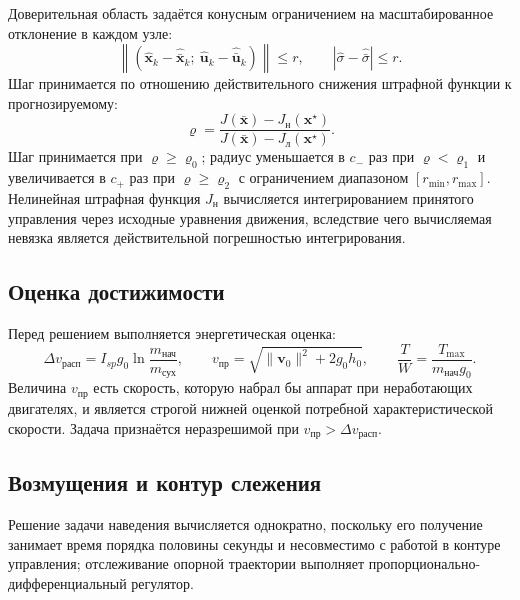 \documentclass[11pt,a4paper]{article}
\newcommand{\vect}[1]{\bm{#1}}
\begin{document}
Доверительная область задаётся конусным ограничением на масштабированное
отклонение в каждом узле:
\begin{equation}
\left\lVert\left(\hat{\vect{x}}_k-\hat{\bar{\vect{x}}}_k;\
 \hat{\vect{u}}_k-\hat{\bar{\vect{u}}}_k\right)\right\rVert \le r,
\qquad
\left\lvert \hat\sigma-\hat{\bar\sigma}\right\rvert \le r .
\end{equation}
Шаг принимается по отношению действительного снижения штрафной функции к
прогнозируемому:
\begin{equation}
\varrho = \frac{J\left(\bar{\vect{x}}\right)
 - J_{\text{н}}\left(\vect{x}^\star\right)}
 {J\left(\bar{\vect{x}}\right)
 - J_{\text{л}}\left(\vect{x}^\star\right)} .
\end{equation}
Шаг принимается при $\varrho\ge\varrho_0$; радиус уменьшается в $c_-$ раз при
$\varrho<\varrho_1$ и увеличивается в $c_+$ раз при $\varrho\ge\varrho_2$ с
ограничением диапазоном $\left[r_{\min},r_{\max}\right]$. Нелинейная штрафная
функция $J_{\text{н}}$ вычисляется интегрированием принятого управления через
исходные уравнения движения, вследствие чего вычисляемая невязка является
действительной погрешностью интегрирования.

\subsection{Оценка достижимости}

Перед решением выполняется энергетическая оценка:
\begin{equation}
\Delta v_{\text{расп}} = I_{sp} g_0
 \ln\frac{m_{\text{нач}}}{m_{\text{сух}}},
\qquad
v_{\text{пр}} = \sqrt{\lVert\vect{v}_0\rVert^2 + 2 g_0 h_0},
\qquad
\frac{T}{W} = \frac{T_{\max}}{m_{\text{нач}} g_0} .
\end{equation}
Величина $v_{\text{пр}}$ есть скорость, которую набрал бы аппарат при
неработающих двигателях, и является строгой нижней оценкой потребной
характеристической скорости. Задача признаётся неразрешимой при
$v_{\text{пр}}>\Delta v_{\text{расп}}$.

\subsection{Возмущения и контур слежения}

Решение задачи наведения вычисляется однократно, поскольку его получение занимает
время порядка половины секунды и несовместимо с работой в контуре управления;
отслеживание опорной траектории выполняет пропорционально-дифференциальный
регулятор.
\end{document}
